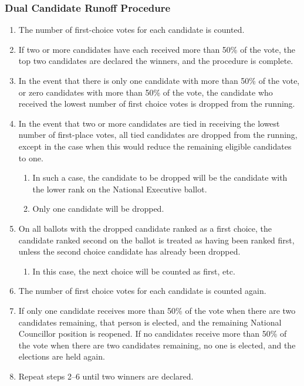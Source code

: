 \subsubsection{Dual Candidate Runoff Procedure}
\label{dual-candidate-runoff-procedure}

\begin{enumerate}
 \item
  The number of first-choice votes for each candidate is counted.
 \item
  If two or more candidates have each received more than 50\% of the vote, the top two candidates are declared the winners, and the procedure is complete.
 \item
  In the event that there is only one candidate with more than 50\% of the vote, or zero candidates with more than 50\% of the vote, the candidate who received the lowest number of first choice votes is dropped from the running.
 \item
  In the event that two or more candidates are tied in receiving the lowest number of first-place votes, all tied candidates are dropped from the running, except in the case when this would reduce the remaining eligible candidates to one.

  \begin{enumerate}
   \item
    In such a case, the candidate to be dropped will be the candidate with the lower rank on the National Executive ballot.
   \item
    Only one candidate will be dropped.
  \end{enumerate}

 \item
  On all ballots with the dropped candidate ranked as a first choice, the candidate ranked second on the ballot is treated as having been ranked first, unless the second choice candidate has already been dropped.

  \begin{enumerate}
   \item
    In this case, the next choice will be counted as first, etc.
  \end{enumerate}

 \item
  The number of first choice votes for each candidate is counted again.
 \item
  If only one candidate receives more than 50\% of the vote when there are two candidates remaining, that person is elected, and the remaining National Councillor position is reopened. If no candidates receive more than 50\% of the vote when there are two candidates remaining, no one is elected, and the elections are held again.
 \item
  Repeat steps 2–6 until two winners are declared.
\end{enumerate}

